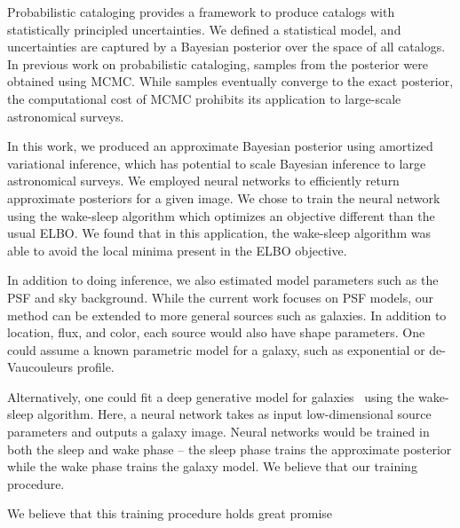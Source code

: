 Probabilistic cataloging provides a framework to 
produce catalogs with statistically principled uncertainties. We defined a statistical model, and uncertainties are captured by a Bayesian posterior over the space of all catalogs.
In previous work on probabilistic cataloging, samples from the posterior were obtained using MCMC. While samples eventually converge to the exact posterior, the computational cost of MCMC prohibits its application to large-scale astronomical surveys. 

In this work, we produced an approximate Bayesian posterior using amortized variational inference, which has potential to scale Bayesian inference to large astronomical surveys. We employed neural networks to efficiently return approximate posteriors for a given image. We chose to train the neural network using the wake-sleep algorithm which optimizes an objective different than the usual ELBO. We found that in this application, the wake-sleep algorithm was able to avoid the local minima present in the ELBO objective. 

In addition to doing inference, we also estimated model parameters such as the PSF and sky background. While the current work focuses on PSF models, our method can be extended to more general sources such as galaxies.
In addition to location, flux, and color, each source would also have shape parameters. One could assume a known parametric model for a galaxy, such as exponential or de-Vaucouleurs profile. 

Alternatively, one could fit a deep generative model for galaxies~\cite{Regier2015ADG} using the wake-sleep algorithm. Here, a neural network takes as input low-dimensional source parameters and outputs a galaxy image. Neural networks would be trained in both the sleep and wake phase -- the sleep phase trains the approximate posterior while the wake phase trains the galaxy model. We believe that our training procedure. 

We believe that this training procedure holds great promise